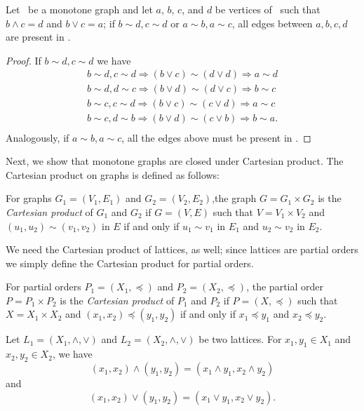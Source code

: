 \begin{lemma}
Let \mG\ be a monotone graph and let
\(a\), \(b\), \(c\), and \(d\) be vertices of \mG\ such that \(b \wedge c = d\) and \(b \vee c = a\);
if \(b\sim d, c\sim d\) or \(a\sim b, a\sim c\), all edges between 
\(a, b, c, d\) are present in \mG\@.
\end{lemma}

\begin{proof}
If \(b\sim d, c\sim d\) we have
\begin{eqnarray*}
b\sim d, c\sim d \Rightarrow (b \vee c) \sim (d \vee d) \Rightarrow a\sim d\\
b\sim d, d\sim c \Rightarrow (b \vee d) \sim (d \vee c) \Rightarrow b\sim c\\
b\sim c, c\sim d \Rightarrow (b \vee c) \sim (c \vee d) \Rightarrow a\sim c\\
b\sim c, d\sim b \Rightarrow (b \vee d) \sim (c \vee b) \Rightarrow b\sim a.\\
\end{eqnarray*}
Analogously, if \(a\sim b, a\sim c\), all the edges above must be present in \mG\@.
\end{proof}

Next, we show that monotone graphs are closed under Cartesian product.
The Cartesian product on graphs is defined as follows:
\begin{defi} 
For graphs \(G_1=(V_1,E_1)\) and \(G_2=(V_2,E_2)\),the graph \(G = G_1 \times G_2\)
is the \emph{Cartesian product} of \(G_1\) and \(G_2\) if \(G=(V,E)\)
such that \(V=V_1 \times V_2\) and \((u_1,u_2)\sim (v_1,v_2)\) in \(E\)
if and only if \(u_1\sim v_1\) in \(E_1\) and \(u_2\sim v_2\) in \(E_2\)\@.
\end{defi}

We need the Cartesian product of lattices, as well;
since lattices are partial orders we simply define the Cartesian product
for partial orders.
\begin{defi} 
For partial orders \(P_1= (X_1,\preceq)\) and \(P_2=(X_2,\preceq)\), 
the partial order \(P= P_1 \times P_2\) is the \emph{Cartesian product} of \(P_1\) and \(P_2\)
if \(P=(X,\preceq)\) such that \(X=X_1\times X_2\) and \((x_1,x_2) \preceq (y_1,y_2)\)
if and only if \(x_1\preceq y_1\) and \(x_2\preceq y_2\)\@.
\end{defi}

\begin{rem}
Let \(L_1=(X_1,\wedge,\vee)\) and \(L_2=(X_2,\wedge,\vee)\) be two lattices.
For \(x_1,y_1 \in X_1\) and \(x_2,y_2\in X_2\), we have
\[(x_1,x_2)\wedge (y_1,y_2) = (x_1\wedge y_1, x_2 \wedge y_2) \]
and \[(x_1,x_2)\vee (y_1,y_2) = (x_1\vee y_1, x_2 \vee y_2).\]
\end{rem}

